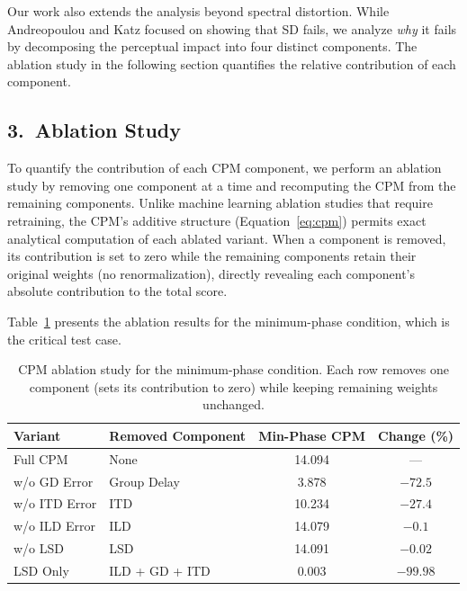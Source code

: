 \documentclass[12pt,a4paper]{article}
\begin{document}
Our work also extends the analysis beyond spectral distortion. While Andreopoulou and Katz focused on showing that SD fails, we analyze \emph{why} it fails by decomposing the perceptual impact into four distinct components. The ablation study in the following section quantifies the relative contribution of each component.


\subsection*{3.\ Ablation Study}

To quantify the contribution of each CPM component, we perform an ablation study by removing one component at a time and recomputing the CPM from the remaining components. Unlike machine learning ablation studies that require retraining, the CPM's additive structure (Equation~\ref{eq:cpm}) permits exact analytical computation of each ablated variant. When a component is removed, its contribution is set to zero while the remaining components retain their original weights (no renormalization), directly revealing each component's absolute contribution to the total score.

Table~\ref{tab:ablation_minphase} presents the ablation results for the minimum-phase condition, which is the critical test case.

\begin{table}[h!]
\centering
\caption{CPM ablation study for the minimum-phase condition. Each row removes one component (sets its contribution to zero) while keeping remaining weights unchanged.}
\label{tab:ablation_minphase}
\small
\begin{tabular}{llcc}
\toprule
\textbf{Variant} & \textbf{Removed Component} & \textbf{Min-Phase CPM} & \textbf{Change (\%)} \\
\midrule
Full CPM         & None             & 14.094 & ---       \\
w/o GD Error     & Group Delay      & 3.878  & $-72.5$   \\
w/o ITD Error    & ITD              & 10.234 & $-27.4$   \\
w/o ILD Error    & ILD              & 14.079 & $-0.1$    \\
w/o LSD          & LSD              & 14.091 & $-0.02$   \\
LSD Only         & ILD + GD + ITD   & 0.003  & $-99.98$  \\
\bottomrule
\end{tabular}
\end{table}
\end{document}
